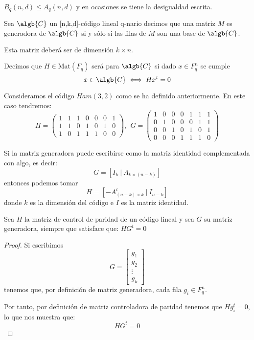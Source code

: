 \obs $B_q(n,d)\leq A_q(n,d)$ y en ocasiones se tiene la desigualdad escrita.

\begin{defn}
Sea $\algb{C}$ un [n,k,d]-código lineal q-nario decimos que una matriz $M$ es generadora de $\algb{C}$ si y sólo si las filas de $M$ son una base de $\algb{C}$.

Esta matriz deberá ser de dimensión $k\times n$.
\end{defn}

Decimos que $H \in \text{Mat}(F_q)$ será  para $\algb{C}$ si dado $x\in F_q^n$ se cumple
\[x \in \algb{C} \iff Hx^t = 0 \]

\begin{example}
Consideramos el código $Ham(3,2)$ como se ha definido anteriormente. En este caso tendremos:
\[H = \left(\begin{array}{ccccccc}
1 & 1 & 1 & 0 & 0 & 0 & 1\\
1 & 1 & 0 & 1 & 0 & 1 & 0\\
1 & 0 & 1 & 1 & 1 & 0 & 0
\end{array} \right), \ \ G=\left(\begin{array}{ccccccc}
1 & 0 & 0 & 0 & 1 & 1 & 1\\
0 & 1 & 0 & 0 & 0 & 1 & 1\\
0 & 0 & 1 & 0 & 1 & 0 & 1\\
0 & 0 & 0 & 1 & 1 & 1 & 0
\end{array}\right) \]
\end{example}

\begin{prop}\label{prop:At-At}
Si la matriz generadora puede escribirse como la matriz identidad complementada con algo, es decir:
\[G=[I_k \ | \ A_{k \times (n-k)}]\]
entonces podemos tomar
\[H = [-A^t_{(n-k) \times k} \ | \ I_{n-k}]\]
donde $k$ es la dimensión del código e $I$ es la matriz identidad.
\end{prop}

\obs Sea $H$ la matriz de control de paridad de un código lineal y sea $G$ su matriz generadora, siempre que satisface que: $HG^t=0$

\begin{proof}
Si escribimos
\[G = \begin{bmatrix} g_1 \\ g_2 \\ \vdots \\ g_k\end{bmatrix}\]
tenemos que, por definición de matriz generadora, cada fila $g_i \in F_q^n$.

Por tanto, por definición de matriz controladora de paridad tenemos que $Hg_i^t = 0$, lo que nos muestra que:
\[HG^t = 0\]
\end{proof}


